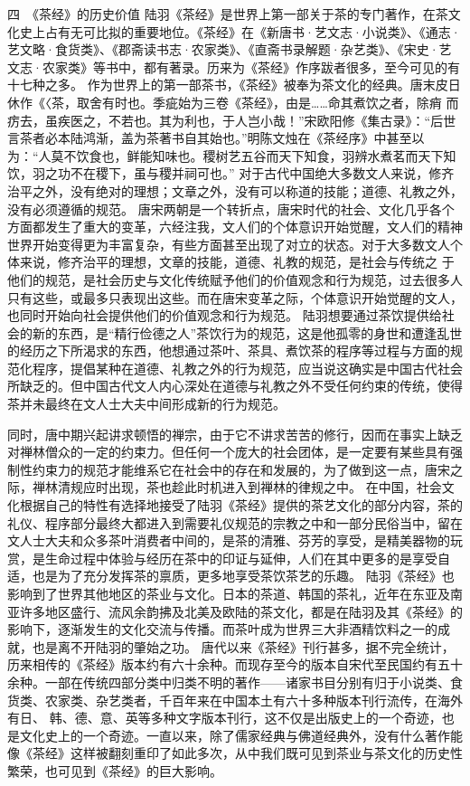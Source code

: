\documentclass[12pt,UTF8]{ctexbook}
\begin{document}
四　《茶经》的历史价值
陆羽《茶经》是世界上第一部关于茶的专门著作，在茶文化史上占有无可比拟的重要地位。《茶经》在《新唐书·艺文志·小说类》、《通志·艺文略·食货类》、《郡斋读书志·农家类》、《直斋书录解题·杂艺类》、《宋史·艺文志·农家类》等书中，都有著录。历来为《茶经》作序跋者很多，至今可见的有十七种之多。
作为世界上的第一部茶书，《茶经》被奉为茶文化的经典。唐末皮日休作《〈茶，取舍有时也。季疵始为三卷《茶经》，由是……命其煮饮之者，除痟
而疠去，虽疾医之，不若也。其为利也，于人岂小哉！”宋欧阳修《集古录》：“后世言茶者必本陆鸿渐，盖为茶著书自其始也。”明陈文烛在《茶经序》中甚至以为：“人莫不饮食也，鲜能知味也。稷树艺五谷而天下知食，羽辨水煮茗而天下知饮，羽之功不在稷下，虽与稷并祠可也。”
对于古代中国绝大多数文人来说，修齐治平之外，没有绝对的理想；文章之外，没有可以称道的技能；道德、礼教之外，没有必须遵循的规范。
唐宋两朝是一个转折点，唐宋时代的社会、文化几乎各个方面都发生了重大的变革，六经注我，文人们的个体意识开始觉醒，文人们的精神世界开始变得更为丰富复杂，有些方面甚至出现了对立的状态。对于大多数文人个体来说，修齐治平的理想，文章的技能，道德、礼教的规范，是社会与传统之
于他们的规范，是社会历史与文化传统赋予他们的价值观念和行为规范，过去很多人只有这些，或最多只表现出这些。而在唐宋变革之际，个体意识开始觉醒的文人，也同时开始向社会提供他们的价值观念和行为规范。
陆羽想要通过茶饮提供给社会的新的东西，是“精行俭德之人”茶饮行为的规范，这是他孤零的身世和遭逢乱世的经历之下所渴求的东西，他想通过茶叶、茶具、煮饮茶的程序等过程与方面的规范化程序，提倡某种在道德、礼教之外的行为规范，应当说这确实是中国古代社会所缺乏的。但中国古代文人内心深处在道德与礼教之外不受任何约束的传统，使得茶并未最终在文人士大夫中间形成新的行为规范。

同时，唐中期兴起讲求顿悟的禅宗，由于它不讲求苦苦的修行，因而在事实上缺乏对禅林僧众的一定的约束力。但任何一个庞大的社会团体，是一定要有某些具有强制性约束力的规范才能维系它在社会中的存在和发展的，为了做到这一点，唐宋之际，禅林清规应时出现，茶也趁此时机进入到禅林的律规之中。
在中国，社会文化根据自己的特性有选择地接受了陆羽《茶经》提供的茶艺文化的部分内容，茶的礼仪、程序部分最终大都进入到需要礼仪规范的宗教之中和一部分民俗当中，留在文人士大夫和众多茶叶消费者中间的，是茶的清雅、芬芳的享受，是精美器物的玩赏，是生命过程中体验与经历在茶中的印证与延伸，人们在其中更多的是享受自适，也是为了充分发挥茶的禀质，更多地享受茶饮茶艺的乐趣。
陆羽《茶经》也影响到了世界其他地区的茶业与文化。日本的茶道、韩国的茶礼，近年在东亚及南亚许多地区盛行、流风余韵拂及北美及欧陆的茶文化，都是在陆羽及其《茶经》的影响下，逐渐发生的文化交流与传播。而茶叶成为世界三大非酒精饮料之一的成就，也是离不开陆羽的肇始之功。
唐代以来《茶经》刊行甚多，据不完全统计，历来相传的《茶经》版本约有六十余种。而现存至今的版本自宋代至民国约有五十余种。一部在传统四部分类中归类不明的著作——诸家书目分别有归于小说类、食货类、农家类、杂艺类者，千百年来在中国本土有六十多种版本刊行流传，在海外有日、
韩、德、意、英等多种文字版本刊行，这不仅是出版史上的一个奇迹，也是文化史上的一个奇迹。一直以来，除了儒家经典与佛道经典外，没有什么著作能像《茶经》这样被翻刻重印了如此多次，从中我们既可见到茶业与茶文化的历史性繁荣，也可见到《茶经》的巨大影响。
\end{document}
